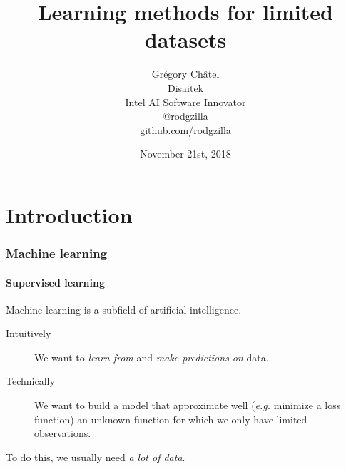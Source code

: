 \documentclass[10pt]{beamer}
\title{Learning methods for limited datasets}
\author[G. Châtel]{Grégory Châtel\\\vspace{0.3cm}Disaitek\\Intel AI Software Innovator\\\vspace{0.3cm}@rodgzilla\\github.com/rodgzilla}
\date{November 21st, 2018}
\begin{document}
\begin{frame}

  \maketitle

\end{frame}

\begin{frame}

  \tableofcontents

\end{frame}

\section{Introduction}

\begin{frame}

  \frametitle{Machine learning}

  \framesubtitle{Supervised learning}

  Machine learning is a subfield of artificial intelligence.

  \bigskip

  \begin{center}
    \scalebox{0.6}{
      
    }
  \end{center}

  \begin{description}
    \item[Intuitively] We want to \emph{learn from} and \emph{make predictions
    on} data.

    \medskip

    \item[Technically] We want to build a model that approximate well
      (\textit{e.g.} minimize a loss function) an unknown function for
      which we only have limited observations.
  \end{description}

  \bigskip

  To do this, we usually need \emph{a lot of data}.

\end{frame}
\end{document}
